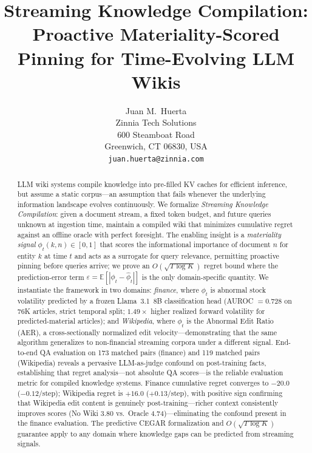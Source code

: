 \documentclass{article}
\title{Streaming Knowledge Compilation: Proactive Materiality-Scored Pinning for Time-Evolving LLM Wikis}
\author{
  Juan M.~Huerta \\
  Zinnia Tech Solutions \\
  600 Steamboat Road \\
  Greenwich, CT 06830, USA \\
  \texttt{juan.huerta@zinnia.com}
}
\begin{document}
\maketitle

\begin{abstract}
LLM wiki systems compile knowledge into pre-filled KV caches for efficient inference, but assume a static corpus---an assumption that fails whenever the underlying information landscape evolves continuously.
We formalize \emph{Streaming Knowledge Compilation}: given a document stream, a fixed token budget, and future queries unknown at ingestion time, maintain a compiled wiki that minimizes cumulative regret against an offline oracle with perfect foresight.
The enabling insight is a \emph{materiality signal} $\phi_t(k,n) \in [0,1]$ that scores the informational importance of document $n$ for entity $k$ at time $t$ and acts as a surrogate for query relevance, permitting proactive pinning before queries arrive; we prove an $O(\sqrt{T\log K})$ regret bound where the prediction-error term $\varepsilon = \mathbb{E}[|\phi_t - \hat{\phi}_t|]$ is the only domain-specific quantity.
We instantiate the framework in two domains: \emph{finance}, where $\phi_t$ is abnormal stock volatility predicted by a frozen Llama~3.1~8B classification head (AUROC $= 0.728$ on 76K articles, strict temporal split; $1.49\times$ higher realized forward volatility for predicted-material articles); and \emph{Wikipedia}, where $\phi_t$ is the Abnormal Edit Ratio (AER), a cross-sectionally normalized edit velocity---demonstrating that the same algorithm generalizes to non-financial streaming corpora under a different signal.
End-to-end QA evaluation on 173 matched pairs (finance) and 119 matched pairs (Wikipedia) reveals a pervasive LLM-as-judge confound on post-training facts, establishing that regret analysis---not absolute QA scores---is the reliable evaluation metric for compiled knowledge systems.
Finance cumulative regret converges to $-20.0$ ($-0.12$/step); Wikipedia regret is $+16.0$ ($+0.13$/step), with positive sign confirming that Wikipedia edit content is genuinely post-training---richer context consistently improves scores (No Wiki 3.80 vs.\ Oracle 4.74)---eliminating the confound present in the finance evaluation.
The predictive CEGAR formalization and $O(\sqrt{T\log K})$ guarantee apply to any domain where knowledge gaps can be predicted from streaming signals.
\end{abstract}

\end{document}
